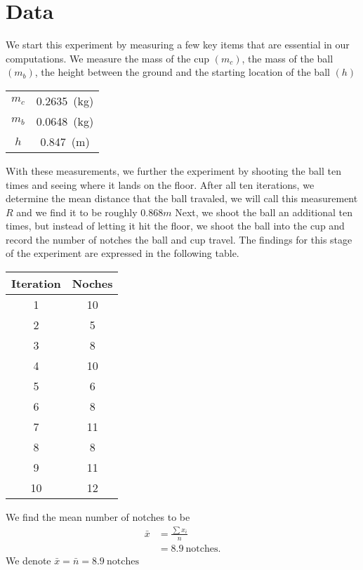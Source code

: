 \documentclass{report}
\begin{document}
    \section{Data}
    \bigbreak \noindent 
    We start this experiment by measuring a few key items that are essential in our computations. We measure the mass of the cup $(m_{c})$, the mass of the ball $(m_{b})$, the height between the ground and the starting location of the ball $(h)$
    \bigbreak \noindent 
    \begin{center}
        \begin{tabular}{c|c}
            \hline
            $m_{c}$ & 0.2635\ (kg) \\
            $m_{b} $ & 0.0648\ (kg)\\
            $h $ & 0.847\ (m)
        \end{tabular}
    \end{center}
    \bigbreak \noindent 
    With these measurements, we further the experiment by shooting the ball ten times and seeing where it lands on the floor. After all ten iterations, we determine the mean distance that the ball travaled, we will call this measurement $R$ and we find it to be roughly $0.868m$
    \bigbreak \noindent 
    Next, we shoot the ball an additional ten times, but instead of letting it hit the floor, we shoot the ball into the cup and record the number of notches the ball and cup travel. The findings for this stage of the experiment are expressed in the following table.
    \bigbreak \noindent
    \begin{center}
        \begin{tabular}{c|c}
            Iteration  &  Noches \\
            \hline
            1&10 \\
            2& 5\\ 
            3& 8\\
            4& 10\\
            5&6 \\
            6& 8\\
            7& 11\\
            8& 8\\
            9& 11\\
            10&12
        \end{tabular}
    \end{center}
    \bigbreak \noindent 
    We find the mean number of notches to be
    \begin{align*}
        \bar{x} &= \frac{\sum x_{i}}{n} \\
        &=8.9\ \text{notches}
    .\end{align*}
    We denote $\bar{x} = \bar{n} = 8.9\ \text{notches}$
\end{document}
